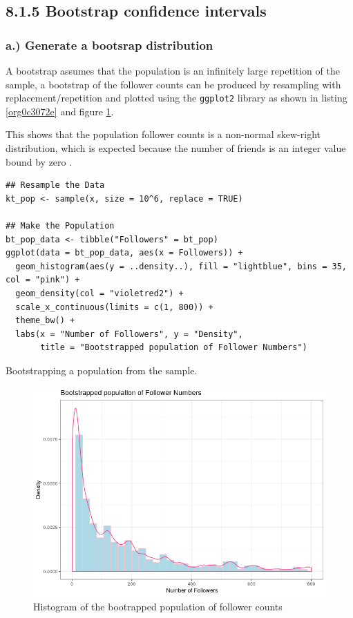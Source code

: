 \documentclass[11pt]{article}
\begin{document}
\subsection{8.1.5 Bootstrap confidence intervals}
\label{sec:org1632e35}
\subsubsection{a.) Generate a bootsrap distribution}
\label{sec:orgec90a05}

A bootstrap assumes that the population is an infinitely large repetition of the
sample, a bootstrap of the follower counts can be produced by resampling with
replacement/repetition and plotted using the \texttt{ggplot2} library as shown in
listing \ref{org0c3072e} and figure \ref{fig:org1bcabb4}.

This shows that the population follower counts is a non-normal skew-right
distribution, which is expected because the number of friends is an integer value bound by zero \cite{nist2013}.

\begin{listing}[htbp]
\begin{verbatim}
## Resample the Data
kt_pop <- sample(x, size = 10^6, replace = TRUE)

## Make the Population
bt_pop_data <- tibble("Followers" = bt_pop)
ggplot(data = bt_pop_data, aes(x = Followers)) +
  geom_histogram(aes(y = ..density..), fill = "lightblue", bins = 35, col = "pink") +
  geom_density(col = "violetred2") +
  scale_x_continuous(limits = c(1, 800)) +
  theme_bw() +
  labs(x = "Number of Followers", y = "Density",
       title = "Bootstrapped population of Follower Numbers")

\end{verbatim}
\caption{\label{org0c3072e}Bootstrapping a population from the sample.}
\end{listing}


\begin{figure}[htbp]
\centering
\includegraphics[width=12cm]{./Figures/BootStrap_Pop.png}
\caption{\label{fig:org1bcabb4}Histogram of the bootrapped population of follower counts}
\end{figure}
\end{document}
